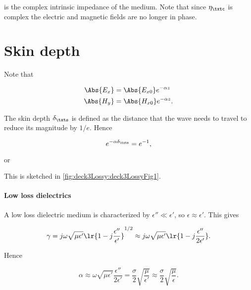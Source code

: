 is the complex intrinsic impedance of the medium.  Note that since \( \eta_\txtc \) is complex the electric and magnetic fields are no longer in phase.

\section{Skin depth}

Note that 

\begin{equation}\label{eqn:uwavesLecture3:260}
\begin{aligned}
\Abs{ E_x } &= \Abs{ E_{x0} } e^{-\alpha z} \\
\Abs{ H_y } &= \Abs{ H_{x0} } e^{-\alpha z}.
\end{aligned}
\end{equation}

The skin depth \( \delta_\txts \) is defined as the distance that the wave needs to travel to reduce its magnitude by \( 1/e \).  Hence

\begin{equation}\label{eqn:uwavesLecture3:280}
e^{ -\alpha \delta_\txts } = e^{-1},
\end{equation}

or


This is sketched in \cref{fig:deck3Lossy:deck3LossyFig1}.


\paragraph{Low loss dielectrics}

A low loss dielectric medium is characterized by \( \epsilon'' \ll \epsilon' \), so \( \epsilon \approx \epsilon' \).  This gives

\begin{dmath}\label{eqn:uwavesLecture3:320}
\gamma 
= 
j \omega \sqrt{\mu \epsilon' } \lr{ 1 -j \frac{\epsilon''}{\epsilon'}}^{1/2} 
\approx 
j \omega \sqrt{\mu \epsilon' } \lr{ 1 - j \frac{\epsilon''}{2 \epsilon'}}.
\end{dmath}

Hence 

\begin{dmath}\label{eqn:uwavesLecture3:340}
\alpha 
\approx
\omega \sqrt{\mu \epsilon'} \frac{\epsilon''}{2 \epsilon'}
= 
\frac{\sigma}{2} \sqrt{\frac{\mu}{\epsilon'}}
\approx
\frac{\sigma}{2} \sqrt{\frac{\mu}{\epsilon}}.
\end{dmath}

